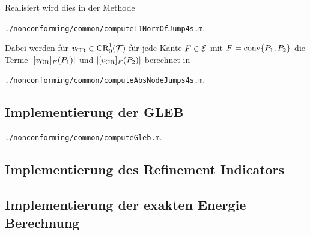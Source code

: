 Realisiert wird dies in der Methode
\begin{center}
  \texttt{./nonconforming/common/computeL1NormOfJump4s.m}.
\end{center}
Dabei werden für $v_\textup{CR}\in\textup{CR}^1_0(\mathcal{T})$ für jede Kante $F\in\mathcal{E}$ mit
$F=\textup{conv}\{P_1,P_2\}$ die Terme $|[v_\textup{CR}]_F(P_1)|$ und $|[v_\textup{CR}]_F(P_2)|$
berechnet in
\begin{center}
  \texttt{./nonconforming/common/computeAbsNodeJumps4s.m}.
\end{center}


\subsection{Implementierung der GLEB}
\begin{center}
  \texttt{./nonconforming/common/computeGleb.m}.
\end{center}

\subsection{Implementierung des Refinement Indicators}

\subsection{Implementierung der exakten Energie Berechnung}


